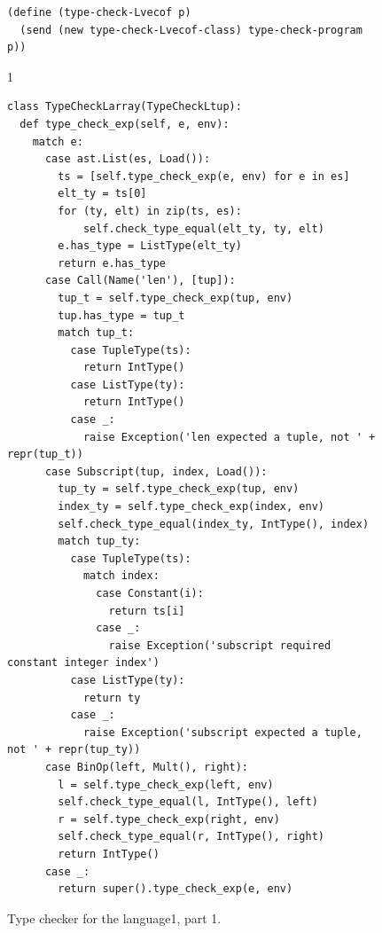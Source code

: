 \documentclass[7x10]{TimesAPriori_MIT}%
\def\pythonEd{1}
\def\edition{1}
\newcommand{\pythonColor}[0]{}
\newcommand{\python}[1]{{\if\edition\pythonEd\pythonColor #1\fi}}
\numberwithin{theorem}{chapter}
\numberwithin{definition}{chapter}
\numberwithin{equation}{chapter}
\begin{document}
\begin{figure}[tbp]
\begin{tcolorbox}[colback=white]
{\begin{lstlisting}[basicstyle=\ttfamily\footnotesize]
(define (type-check-Lvecof p)
  (send (new type-check-Lvecof-class) type-check-program p))
    \end{lstlisting}
    \fi}
{\if\edition\pythonEd\pythonColor    
\begin{lstlisting}[basicstyle=\ttfamily\footnotesize]
class TypeCheckLarray(TypeCheckLtup):
  def type_check_exp(self, e, env):
    match e:
      case ast.List(es, Load()):
        ts = [self.type_check_exp(e, env) for e in es]
        elt_ty = ts[0]
        for (ty, elt) in zip(ts, es):
            self.check_type_equal(elt_ty, ty, elt)
        e.has_type = ListType(elt_ty)
        return e.has_type
      case Call(Name('len'), [tup]):
        tup_t = self.type_check_exp(tup, env)
        tup.has_type = tup_t
        match tup_t:
          case TupleType(ts):
            return IntType()
          case ListType(ty):
            return IntType()
          case _:
            raise Exception('len expected a tuple, not ' + repr(tup_t))
      case Subscript(tup, index, Load()):
        tup_ty = self.type_check_exp(tup, env)
        index_ty = self.type_check_exp(index, env)
        self.check_type_equal(index_ty, IntType(), index)
        match tup_ty:
          case TupleType(ts):
            match index:
              case Constant(i):
                return ts[i]
              case _:
                raise Exception('subscript required constant integer index')
          case ListType(ty):
            return ty
          case _:
            raise Exception('subscript expected a tuple, not ' + repr(tup_ty))
      case BinOp(left, Mult(), right):
        l = self.type_check_exp(left, env)
        self.check_type_equal(l, IntType(), left)
        r = self.type_check_exp(right, env)
        self.check_type_equal(r, IntType(), right)
        return IntType()
      case _:
        return super().type_check_exp(e, env)
\end{lstlisting}
\fi}
  \end{tcolorbox}

  \caption{Type checker for the \LangArray{} language\python{, part 1}.}
\label{fig:type-check-Lvecof}
\end{figure}
\end{document}
